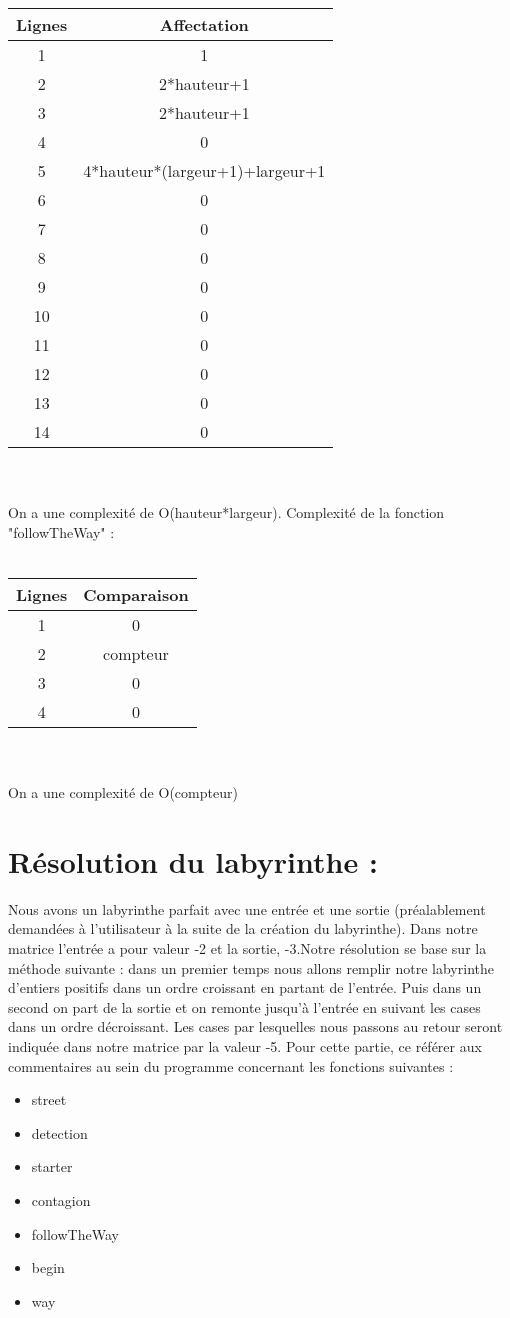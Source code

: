 \documentclass[12pt]{report}
\begin{document}
\begin{tabular}{|c||c|}
\hline
Lignes & Affectation \\
\hline
1 & 1 \\
\hline
2 & 2*hauteur+1 \\
\hline
3 & 2*hauteur+1 \\
\hline
4 & 0 \\
\hline
5 & 4*hauteur*(largeur+1)+largeur+1 \\
\hline
6 & 0 \\
\hline
7 & 0 \\
\hline
8 & 0 \\
\hline
9 & 0 \\
\hline
10 & 0 \\
\hline
11 & 0 \\
\hline
12 & 0 \\
\hline
13 & 0 \\
\hline
14 & 0 \\
\hline
\end{tabular} \\ \\
On a une complexité de O(hauteur*largeur).
\clearpage
Complexité de la fonction "followTheWay" : \\ \\
\begin{tabular}{|c||c|}
\hline
Lignes & Comparaison \\
\hline
1 & 0 \\
\hline
2 & compteur \\
\hline
3 & 0 \\
\hline
4 & 0 \\
\hline
\end{tabular} \\ \\
On a une complexité de O(compteur)


\section{Résolution du labyrinthe :}
Nous avons un labyrinthe parfait avec une entrée et une sortie (préalablement demandées à l'utilisateur à la suite de la création du labyrinthe). Dans notre matrice l'entrée a pour valeur -2 et la sortie, -3.Notre résolution se base sur la méthode suivante : dans un premier temps nous allons remplir notre labyrinthe d'entiers positifs dans un ordre croissant en partant de l'entrée. Puis dans un second on part de la sortie et on remonte jusqu'à l'entrée en suivant les cases dans un ordre décroissant. Les cases par lesquelles nous passons au retour seront indiquée dans notre matrice par la valeur -5. 
Pour cette partie, ce référer aux commentaires au sein du programme concernant les fonctions suivantes :
\begin{itemize}
\item street
\item detection
\item starter
\item contagion
\item followTheWay
\item begin
\item way
\end{itemize}
\end{document}
